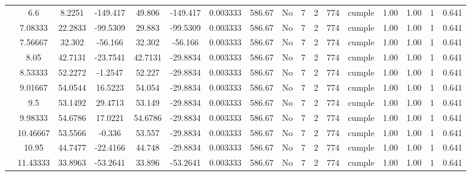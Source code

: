\begin{table}[H]
{\begin{tabular}{|c|c|c|c|c|c|c|c|c|c|c|c|c|c|c|c|c|}
\cline{2-17}    & \cellcolor[rgb]{ .851,  .882,  .949}6.6 & 8.2251 & -149.417 & 49.806 & -149.417 & 0.003333 & 586.67 & No  & 7   & 2   & 774 & \cellcolor[rgb]{ .776,  .937,  .808}cumple & 1.00 & 1.00 & 1   & 0.641 \bigstrut\\
\cline{2-17}    & 7.08333 & 22.2833 & -99.5309 & 29.883 & -99.5309 & 0.003333 & 586.67 & No  & 7   & 2   & 774 & \cellcolor[rgb]{ .776,  .937,  .808}cumple & 1.00 & 1.00 & 1   & 0.641 \bigstrut\\
\cline{2-17}    & 7.56667 & 32.302 & -56.166 & 32.302 & -56.166 & 0.003333 & 586.67 & No  & 7   & 2   & 774 & \cellcolor[rgb]{ .776,  .937,  .808}cumple & 1.00 & 1.00 & 1   & 0.641 \bigstrut\\
\cline{2-17}    & 8.05 & 42.7131 & -23.7541 & 42.7131 & -29.8834 & 0.003333 & 586.67 & No  & 7   & 2   & 774 & \cellcolor[rgb]{ .776,  .937,  .808}cumple & 1.00 & 1.00 & 1   & 0.641 \bigstrut\\
\cline{2-17}    & 8.53333 & 52.2272 & -1.2547 & 52.227 & -29.8834 & 0.003333 & 586.67 & No  & 7   & 2   & 774 & \cellcolor[rgb]{ .776,  .937,  .808}cumple & 1.00 & 1.00 & 1   & 0.641 \bigstrut\\
\cline{2-17}    & 9.01667 & 54.0544 & 16.5223 & 54.054 & -29.8834 & 0.003333 & 586.67 & No  & 7   & 2   & 774 & \cellcolor[rgb]{ .776,  .937,  .808}cumple & 1.00 & 1.00 & 1   & 0.641 \bigstrut\\
\cline{2-17}    & 9.5 & 53.1492 & 29.4713 & 53.149 & -29.8834 & 0.003333 & 586.67 & No  & 7   & 2   & 774 & \cellcolor[rgb]{ .776,  .937,  .808}cumple & 1.00 & 1.00 & 1   & 0.641 \bigstrut\\
\cline{2-17}    & 9.98333 & 54.6786 & 17.0221 & 54.6786 & -29.8834 & 0.003333 & 586.67 & No  & 7   & 2   & 774 & \cellcolor[rgb]{ .776,  .937,  .808}cumple & 1.00 & 1.00 & 1   & 0.641 \bigstrut\\
\cline{2-17}    & 10.46667 & 53.5566 & -0.336 & 53.557 & -29.8834 & 0.003333 & 586.67 & No  & 7   & 2   & 774 & \cellcolor[rgb]{ .776,  .937,  .808}cumple & 1.00 & 1.00 & 1   & 0.641 \bigstrut\\
\cline{2-17}    & 10.95 & 44.7477 & -22.4166 & 44.748 & -29.8834 & 0.003333 & 586.67 & No  & 7   & 2   & 774 & \cellcolor[rgb]{ .776,  .937,  .808}cumple & 1.00 & 1.00 & 1   & 0.641 \bigstrut\\
\cline{2-17}    & 11.43333 & 33.8963 & -53.2641 & 33.896 & -53.2641 & 0.003333 & 586.67 & No  & 7   & 2   & 774 & \cellcolor[rgb]{ .776,  .937,  .808}cumple & 1.00 & 1.00 & 1   & 0.641 \bigstrut\\

\end{tabular}}
\end{table}
